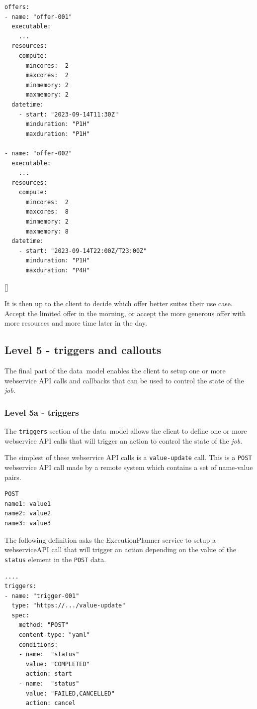 \documentclass[11pt,a4paper]{ivoa}
\newcommand{\datamodel} {data~model}
\newcommand{\webservice} {webservice}
\newcommand{\execplanner} {ExecutionPlanner}
\newcommand{\codeword}[1] {\texttt{#1}}
\newcommand{\job} {\textit{job}}
\begin{document}
\begin{lstlisting}[]
offers:
- name: "offer-001"
  executable:
    ...
  resources:
    compute:
      mincores:  2
      maxcores:  2
      minmemory: 2
      maxmemory: 2
  datetime:
    - start: "2023-09-14T11:30Z"
      minduration: "P1H"
      maxduration: "P1H"

- name: "offer-002"
  executable:
    ...
  resources:
    compute:
      mincores:  2
      maxcores:  8
      minmemory: 2
      maxmemory: 8
  datetime:
    - start: "2023-09-14T22:00Z/T23:00Z"
      minduration: "P1H"
      maxduration: "P4H"
\end{lstlisting}[]

It is then up to the client to decide which offer better suites their use case.
Accept the limited offer in the morning, or accept the more generous offer with
more resources and more time later in the day.

\subsection{Level 5 - triggers and callouts}
\label{triggers-callouts}

The final part of the \datamodel{} enables the client to setup one or more
\webservice{} API calls and callbacks that can be used to control the
state of the \job{}.

\subsubsection{Level 5a - triggers}
\label{triggers}

The \codeword{triggers} section of the \datamodel{} allows the client to
define one or more \webservice{} API calls that will trigger an action
to control the state of the \job{}.

The simplest of these \webservice{} API calls is a \codeword{value-update} call.
This is a \codeword{POST} \webservice{} API call made by a remote system which
contains a set of name-value pairs.

\begin{lstlisting}[]
POST
name1: value1
name2: value2
name3: value3
\end{lstlisting}

The following definition asks the \execplanner{} service to setup a \webservice API call
that will trigger an action depending on the value of the \codeword{status}
element in the \codeword{POST} data.

\begin{lstlisting}[]
....
triggers:
- name: "trigger-001"
  type: "https://.../value-update"
  spec:
    method: "POST"
    content-type: "yaml"
    conditions:
    - name:  "status"
      value: "COMPLETED"
      action: start
    - name:  "status"
      value: "FAILED,CANCELLED"
      action: cancel
\end{lstlisting}
\end{document}
